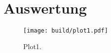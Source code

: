 \section{Auswertung}
\label{sec:Auswertung}
\begin{figure}
  \centering
  \texttt{[image: build/plot1.pdf]}
  \caption{Plot1.}
  \label{fig:plot1}
\end{figure}
